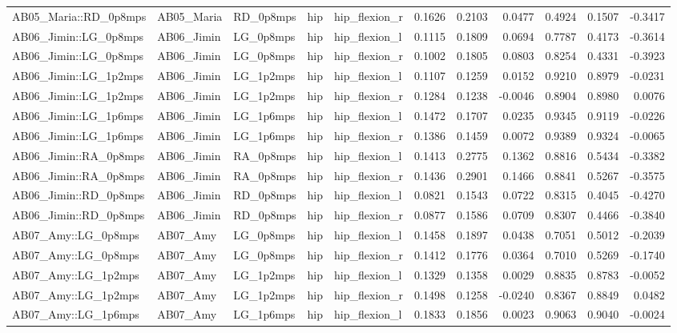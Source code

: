 \begin{table}
\begin{tabular}{lllllrrrrrr}
AB05_Maria::RD_0p8mps & AB05_Maria & RD_0p8mps & hip & hip_flexion_r & 0.1626 & 0.2103 & 0.0477 & 0.4924 & 0.1507 & -0.3417 \\
AB06_Jimin::LG_0p8mps & AB06_Jimin & LG_0p8mps & hip & hip_flexion_l & 0.1115 & 0.1809 & 0.0694 & 0.7787 & 0.4173 & -0.3614 \\
AB06_Jimin::LG_0p8mps & AB06_Jimin & LG_0p8mps & hip & hip_flexion_r & 0.1002 & 0.1805 & 0.0803 & 0.8254 & 0.4331 & -0.3923 \\
AB06_Jimin::LG_1p2mps & AB06_Jimin & LG_1p2mps & hip & hip_flexion_l & 0.1107 & 0.1259 & 0.0152 & 0.9210 & 0.8979 & -0.0231 \\
AB06_Jimin::LG_1p2mps & AB06_Jimin & LG_1p2mps & hip & hip_flexion_r & 0.1284 & 0.1238 & -0.0046 & 0.8904 & 0.8980 & 0.0076 \\
AB06_Jimin::LG_1p6mps & AB06_Jimin & LG_1p6mps & hip & hip_flexion_l & 0.1472 & 0.1707 & 0.0235 & 0.9345 & 0.9119 & -0.0226 \\
AB06_Jimin::LG_1p6mps & AB06_Jimin & LG_1p6mps & hip & hip_flexion_r & 0.1386 & 0.1459 & 0.0072 & 0.9389 & 0.9324 & -0.0065 \\
AB06_Jimin::RA_0p8mps & AB06_Jimin & RA_0p8mps & hip & hip_flexion_l & 0.1413 & 0.2775 & 0.1362 & 0.8816 & 0.5434 & -0.3382 \\
AB06_Jimin::RA_0p8mps & AB06_Jimin & RA_0p8mps & hip & hip_flexion_r & 0.1436 & 0.2901 & 0.1466 & 0.8841 & 0.5267 & -0.3575 \\
AB06_Jimin::RD_0p8mps & AB06_Jimin & RD_0p8mps & hip & hip_flexion_l & 0.0821 & 0.1543 & 0.0722 & 0.8315 & 0.4045 & -0.4270 \\
AB06_Jimin::RD_0p8mps & AB06_Jimin & RD_0p8mps & hip & hip_flexion_r & 0.0877 & 0.1586 & 0.0709 & 0.8307 & 0.4466 & -0.3840 \\
AB07_Amy::LG_0p8mps & AB07_Amy & LG_0p8mps & hip & hip_flexion_l & 0.1458 & 0.1897 & 0.0438 & 0.7051 & 0.5012 & -0.2039 \\
AB07_Amy::LG_0p8mps & AB07_Amy & LG_0p8mps & hip & hip_flexion_r & 0.1412 & 0.1776 & 0.0364 & 0.7010 & 0.5269 & -0.1740 \\
AB07_Amy::LG_1p2mps & AB07_Amy & LG_1p2mps & hip & hip_flexion_l & 0.1329 & 0.1358 & 0.0029 & 0.8835 & 0.8783 & -0.0052 \\
AB07_Amy::LG_1p2mps & AB07_Amy & LG_1p2mps & hip & hip_flexion_r & 0.1498 & 0.1258 & -0.0240 & 0.8367 & 0.8849 & 0.0482 \\
AB07_Amy::LG_1p6mps & AB07_Amy & LG_1p6mps & hip & hip_flexion_l & 0.1833 & 0.1856 & 0.0023 & 0.9063 & 0.9040 & -0.0024 \\

\end{tabular}
\end{table}
